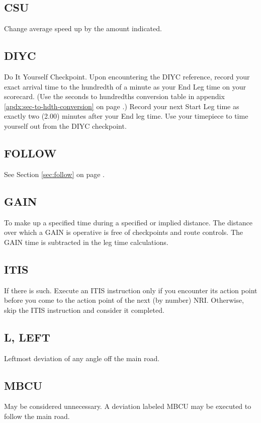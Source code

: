\subsection{CSU}
Change average speed up by the amount indicated.

\subsection{DIYC}
Do It Yourself Checkpoint.  Upon encountering the DIYC reference, record your exact arrival time to the hundredth of a minute as your End Leg time on your scorecard.  (Use the seconds to hundredths conversion table in appendix \ref{apdx:sec-to-hdth-conversion} on page \pageref{apdx:sec-to-hdth-conversion}.)  Record your next Start Leg time as exactly two (2.00) minutes after your End leg time.  Use your timepiece to time yourself out from the DIYC checkpoint.

\subsection{FOLLOW}
See Section \ref{sec:follow} on page \pageref{sec:follow}.

\subsection{GAIN}
To make up a specified time during a specified or implied distance.  The distance over which a GAIN is operative is free of checkpoints and route controls.  The GAIN time is subtracted in the leg time calculations.

\subsection{ITIS}
If there is such.  Execute an ITIS instruction only if you encounter its action point before you come to the action point of the next (by number) NRI.  Otherwise, skip the ITIS instruction and consider it completed.

\subsection{L, LEFT}
Leftmost deviation of any angle off the main road.

\subsection{MBCU}
May be considered unnecessary.  A deviation labeled MBCU may be executed to follow the main road.

